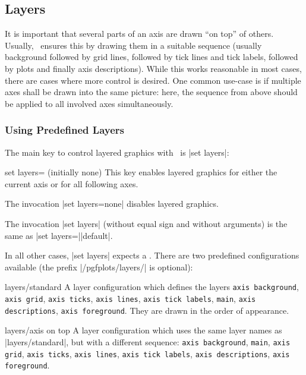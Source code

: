 \subsection{Layers}
{
%

It is important that several parts of an axis are drawn ``on top'' of others. Usually, \PGFPlots\ ensures this by drawing them in a suitable sequence (usually background followed by grid lines, followed by tick lines and tick labels, followed by plots and finally axis descriptions). While this works reasonable in most cases, there are cases where more control is desired. One common use-case is if multiple axes shall be drawn into the same picture: here, the sequence from above should be applied to all involved axes simultaneously. 

\subsubsection{Using Predefined Layers}
The main key to control layered graphics with \PGFPlots\ is |set layers|:


\begin{pgfplotskey}{set layers= (initially none)}
   This key enables layered graphics for either the current axis or for all following axes. 

   The invocation |set layers=none| disables layered graphics.

   The invocation |set layers| (without equal sign and without arguments) is the same as |set layers=||default|.

   In all other cases, |set layers| expects a . There are two predefined configurations available (the prefix |/pgfplots/layers/| is optional):

   \begin{pgfplotskey}{layers/standard}
   	A layer configuration which defines the layers \texttt{axis background}, \texttt{axis grid}, \texttt{axis ticks}, \texttt{axis lines}, \texttt{axis tick labels}, \texttt{main}, \texttt{axis descriptions}, \texttt{axis foreground}. They are drawn in the order of appearance.
   \end{pgfplotskey}

   \begin{pgfplotskey}{layers/axis on top}
   	A layer configuration which uses the same layer names as |layers/standard|, but with a different sequence: \texttt{axis background}, \texttt{main}, \texttt{axis grid}, \texttt{axis ticks}, \texttt{axis lines}, \texttt{axis tick labels}, \texttt{axis descriptions}, \texttt{axis foreground}.


\end{pgfplotskey}
\end{pgfplotskey}}
